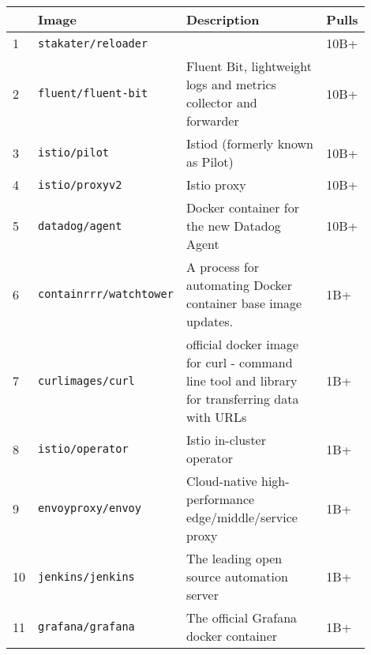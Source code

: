 \begin{table}[h]
    \centering
    \begin{tabular}{| p{0.02\linewidth} | p{0.3\linewidth} | p{0.5\linewidth} | p{0.08\linewidth} |}
        \hline
        \centering \textbf{}     & \centering \textbf{Image}              & \centering \textbf{Description}                                    & \centering\arraybackslash \textbf{Pulls} \\ \hline
        1  & \texttt{stakater/reloader}     &                                                                                                 & 10B+  \\ \hline
        2  & \texttt{fluent/fluent-bit}     & Fluent Bit, lightweight logs and metrics collector and forwarder                                & 10B+  \\ \hline
        3  & \texttt{istio/pilot}           & Istiod (formerly known as Pilot)                                                                & 10B+  \\ \hline
        4  & \texttt{istio/proxyv2}         & Istio proxy                                                                                     & 10B+  \\ \hline
        5  & \texttt{datadog/agent}         & Docker container for the new Datadog Agent                                                      & 10B+  \\ \hline
        6  & \texttt{containrrr/watchtower} & A process for automating Docker container base image updates.                                   & 1B+   \\ \hline
        7  & \texttt{curlimages/curl}       & official docker image for curl - command line tool and library  for transferring data with URLs & 1B+   \\ \hline
        8  & \texttt{istio/operator}        & Istio in-cluster operator                                                                       & 1B+   \\ \hline
        9  & \texttt{envoyproxy/envoy}      & Cloud-native high-performance edge/middle/service proxy                                         & 1B+   \\ \hline
        10 & \texttt{jenkins/jenkins}       & The leading open source automation server                                                       & 1B+   \\ \hline
        11 & \texttt{grafana/grafana}       & The official Grafana docker container                                                           & 1B+   \\ \hline

\end{tabular}
\end{table}
